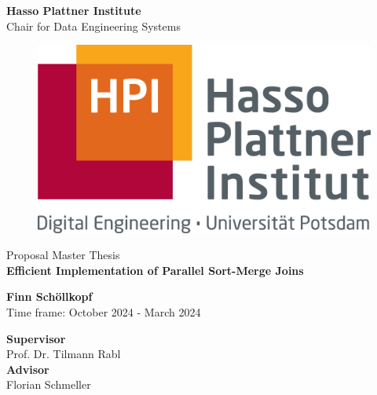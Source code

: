 \documentclass[a4paper, titlepage, 12pt]{article}
\newcommand{\thesisTitle}{Efficient Implementation of Parallel Sort-Merge Joins}
\newcommand{\name}{Finn Schöllkopf}
\newcommand{\timeFrame}{October 2024 - March 2024}
\newcommand{\supervisor}{Prof. Dr. Tilmann Rabl}
\newcommand{\advisor}{Florian Schmeller}
\newcommand{\thesisType}{Master}
\begin{document}
\begin{titlepage}
\begin{center}
\LARGE{\textbf{Hasso Plattner Institute}}\\
\normalsize{Chair for Data Engineering Systems}\\[0.3cm]

\begin{figure}[h!]
    \centering
    \includegraphics[width=.3\linewidth]{images/hpi_logo.jpg}
\end{figure}
\vspace{1cm}

\LARGE{Proposal {\thesisType} Thesis}\\[0.7cm]
\Huge{\textbf{\thesisTitle}}

\vspace{1cm} 

\Large{\textbf{\name}} \\[3pt]  
\vspace{0.5cm}
\large{Time frame: \timeFrame} \\ 

\vspace{1cm}

\large{\textbf{Supervisor}}\\
\supervisor\\
\vspace{0.5cm}
\textbf{Advisor}\\
\advisor\\
\end{center}
\end{titlepage}







\clearpage

{\small 

}
\end{document}
